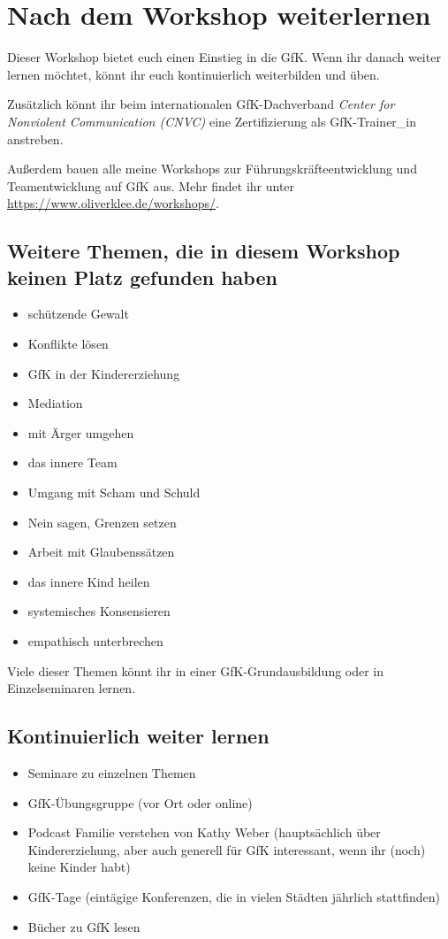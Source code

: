 \section{Nach dem Workshop weiterlernen}
\label{gfk-weiterlernen}

Dieser Workshop bietet euch einen Einstieg in die GfK. Wenn ihr danach weiter lernen möchtet, könnt ihr euch kontinuierlich weiterbilden und üben.

Zusätzlich könnt ihr beim internationalen GfK-Dachverband \emph{Center for Nonviolent Communication (CNVC)} eine Zertifizierung als GfK-Trainer\_in anstreben.

Außerdem bauen alle meine Workshops zur Führungskräfteentwicklung und Teamentwicklung auf GfK aus. Mehr findet ihr unter \url{https://www.oliverklee.de/workshops/}.

\subsection{Weitere Themen, die in diesem Workshop keinen Platz gefunden haben}

\begin{itemize}
    \item schützende Gewalt
    \item Konflikte lösen
    \item GfK in der Kindererziehung
    \item Mediation
    \item mit Ärger umgehen
    \item das innere Team
    \item Umgang mit Scham und Schuld
    \item Nein sagen, Grenzen setzen
    \item Arbeit mit Glaubenssätzen
    \item das innere Kind heilen
    \item systemisches Konsensieren
    \item empathisch unterbrechen
\end{itemize}

Viele dieser Themen könnt ihr in einer GfK-Grundausbildung oder in Einzelseminaren lernen.

\subsection{Kontinuierlich weiter lernen}

\begin{itemize}
    \item Seminare zu einzelnen Themen
    \item GfK-Übungsgruppe (vor Ort oder online)
    \item Podcast \glqq Familie verstehen\grqq\cite{familie-verstehen-podcast} von Kathy Weber (hauptsächlich über Kindererziehung, aber auch generell für GfK interessant, wenn ihr (noch) keine Kinder habt)
    \item GfK-Tage (eintägige Konferenzen, die in vielen Städten jährlich stattfinden)
    \item Bücher zu GfK lesen
\end{itemize}

